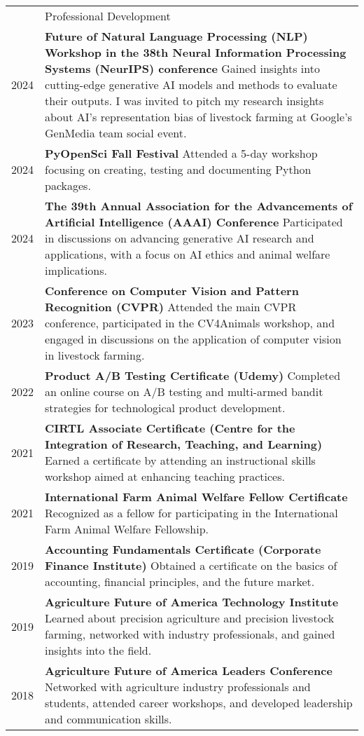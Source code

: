 \documentclass[letterpaper, 11pt]{article}
\newcommand{\headingfont}{\Large\color{OliveGreen}}
\newenvironment{SectionTable}[1]{
	\renewcommand*{\arraystretch}{1.7}
	\setlength{\tabcolsep}{10pt}
	\begin{longtable}{Rp{5.2in}} & #1 \\}
{\end{longtable}\vspace{-.3cm}}
\begin{document}
\begin{SectionTable}{\headingfont Professional Development}
2024 &
\textbf{Future of Natural Language Processing (NLP) Workshop in the 38th Neural Information Processing Systems (NeurIPS) conference } \newline
Gained insights into cutting-edge generative AI models and methods to evaluate their outputs. I was invited to pitch my research insights about AI's representation bias of livestock farming at Google's GenMedia team social event. \\
2024 &
\textbf{PyOpenSci Fall Festival} \newline
Attended a 5-day workshop focusing on creating, testing and documenting Python packages. \\
2024 &
\textbf{The 39th Annual Association for the Advancements of Artificial Intelligence (AAAI) Conference } \newline
Participated in discussions on advancing generative AI research and applications, with a focus on AI ethics and animal welfare implications. \\
2023 &
\textbf{Conference on Computer Vision and Pattern Recognition (CVPR)} \newline
Attended the main CVPR conference, participated in the CV4Animals workshop, and engaged in discussions on the application of computer vision in livestock farming. \\
2022 &
\textbf{Product A/B Testing Certificate (Udemy)} \newline
Completed an online course on A/B testing and multi-armed bandit strategies for technological product development. \\
2021 &
\textbf{CIRTL Associate Certificate (Centre for the Integration of Research, Teaching, and Learning)} \newline
Earned a certificate by attending an instructional skills workshop aimed at enhancing teaching practices. \\
2021 &
\textbf{International Farm Animal Welfare Fellow Certificate} \newline
Recognized as a fellow for participating in the International Farm Animal Welfare Fellowship. \\
2019 &
\textbf{Accounting Fundamentals Certificate (Corporate Finance Institute)} \newline
Obtained a certificate on the basics of accounting, financial principles, and the future market. \\
2019 &
\textbf{Agriculture Future of America Technology Institute} \newline
Learned about precision agriculture and precision livestock farming, networked with industry professionals, and gained insights into the field. \\
2018 &
\textbf{Agriculture Future of America Leaders Conference} \newline
Networked with agriculture industry professionals and students, attended career workshops, and developed leadership and communication skills. \\
\end{SectionTable}
\end{document}
